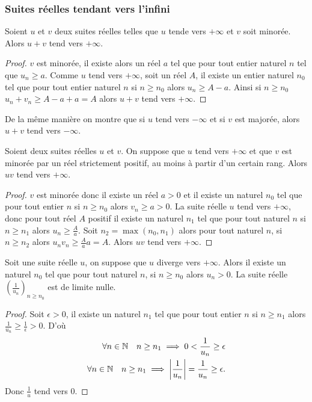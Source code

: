 \subsubsection{Suites réelles tendant vers l'infini}

\begin{prop}
  Soient $u$ et $v$ deux suites réelles telles que $u$ tende vers $+\infty$ et $v$ soit minorée. Alors $u+v$ tend vers $+\infty$.
\end{prop}
\begin{proof}
  $v$ est minorée, il existe alors un réel $a$ tel que pour tout entier naturel $n$ tel que $u_n \geq a$. Comme $u$ tend vers $+\infty$, soit un réel $A$, il existe un entier naturel $n_0$ tel que pour tout entier naturel $n$ si $n \geq n_0$ alors $u_n \geq A-a$. Ainsi si $n \geq n_0$ $u_n+v_n \geq A-a+a =A$ alors $u+v$ tend vers $+\infty$.
\end{proof}
\begin{prop}
  De la même manière on montre que si $u$ tend vers $-\infty$ et si $v$ est majorée, alors $u+v$ tend vers $-\infty$.
\end{prop}
\begin{prop}
  Soient deux suites réelles $u$ et $v$. On suppose que $u$ tend vers $+\infty$ et que $v$ est minorée par un réel strictement positif, au moins à partir d'un certain rang. Alors $uv$ tend vers $+\infty$.
\end{prop}
\begin{proof}
  $v$ est minorée donc il existe un réel $a>0$ et il existe un naturel $n_0$ tel que pour tout entier $n$ si $n \geq n_0$ alors $v_n \geq a > 0$. La suite réelle $u$ tend vers $+\infty$, donc pour tout réel $A$ positif il existe un naturel $n_1$ tel que pour tout naturel $n$ si $n \geq n_1$ alors $u_n \geq \frac{A}{a}$. Soit $n_2=\max(n_0,n_1)$ alors pour tout naturel $n$, si $n \geq n_2$ alors $u_nv_n \geq \frac{A}{a} a=A$. Alors $uv$ tend vers $+\infty$.
\end{proof}
\begin{prop}
  Soit une suite réelle $u$, on suppose que $u$ diverge vers $+\infty$. Alors il existe un naturel $n_0$ tel que pour tout naturel $n$, si $n \geq n_0$ alors $u_n>0$. La suite réelle $\left(\frac{1}{u_n}\right)_{n \geq n_0}$ est de limite nulle. 
\end{prop}
\begin{proof}
  Soit $\epsilon > 0$, il existe un naturel $n_1$ tel que pour tout entier $n$ si $n \geq n_1$ alors $\frac{1}{u_n} \geq \frac{1}{\epsilon} > 0$. D'où
  \begin{align}
    \forall n \in \mathbb{N} \quad n \geq n_1 \implies 0 < \frac{1}{u_n} \geq \epsilon \\
    \forall n \in \mathbb{N} \quad n \geq n_1 \implies \left\lvert\frac{1}{u_n}\right\rvert= \frac{1}{u_n} \geq \epsilon.
  \end{align}
  Donc $\frac{1}{u}$ tend vers 0.
\end{proof}
